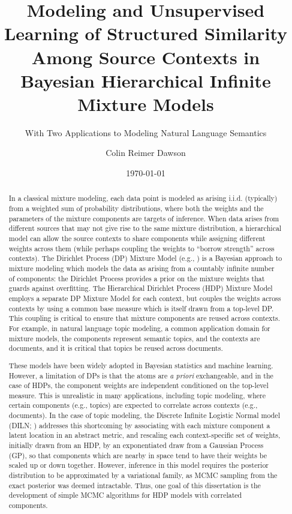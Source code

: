 \documentclass[12pt,letterpaper]{report}
\title{Modeling and Unsupervised Learning of Structured Similarity Among
  Source Contexts in Bayesian Hierarchical Infinite Mixture Models}
\subtitle{With Two Applications to Modeling Natural Language Semantics}
\author{Colin Reimer Dawson}
\date{\today}
\begin{document}
\maketitle

\tableofcontents

\doublespacing

\begin{abstract}
In a classical mixture modeling, each data point is modeled as arising
i.i.d. (typically) from a weighted sum of probability distributions,
where both the weights and the parameters of the mixture components
are targets of inference.  When data arises from different sources
that may not give rise to the same mixture distribution, a
hierarchical model can allow the source contexts to share components while
assigning different weights across them (while perhaps coupling the
weights to ``borrow strength'' across contexts).  The Dirichlet
Process (DP) Mixture Model (e.g., \citet{rasmussen2000infinite}) is a Bayesian
approach to mixture modeling which models the data as arising from a countably
infinite number of components: the Dirichlet Process provides a prior
on the mixture weights that guards against overfitting.  The Hierarchical 
Dirichlet Process (HDP) Mixture Model \citep{teh2006hierarchical} employs
a separate DP Mixture Model for each context, but
couples the weights across contexts by using a common base measure which is
itself drawn from a top-level DP.  This coupling is critical to ensure
that mixture components are reused across contexts.
For example, in natural language topic modeling, a common application
domain for mixture models, the components represent semantic topics,
and the contexts are documents, and it is critical that topics be reused
across documents.

These models have been widely adopted in Bayesian statistics and
machine learning.  However, a limitation of DPs is that the atoms
are {\it a priori} exchangeable, and in the case of HDPs, the
component weights are independent conditioned on the top-level
measure.  This is unrealistic in many applications, including topic modeling, where certain
components (e.g., topics) are expected to correlate across contexts
(e.g., documents).  In the case of topic modeling, the Discrete
Infinite Logistic Normal model (DILN; \citet{paisley2011discrete}) addresses
this shortcoming by associating with each mixture component a latent
location in an abstract metric, and rescaling each context-specific
set of weights, initially drawn from an HDP, 
by an exponentiated draw from a Gaussian Process (GP), so that
components which are nearby in space tend to have their weights be
scaled up or down together.  However, inference in this model requires
the posterior distribution to be approximated by a variational family,
as MCMC sampling from the exact posterior was deemed intractable.
Thus, one goal of this dissertation is the development of simple MCMC
algorithms for HDP models with correlated components.


\end{abstract}
\end{document}
